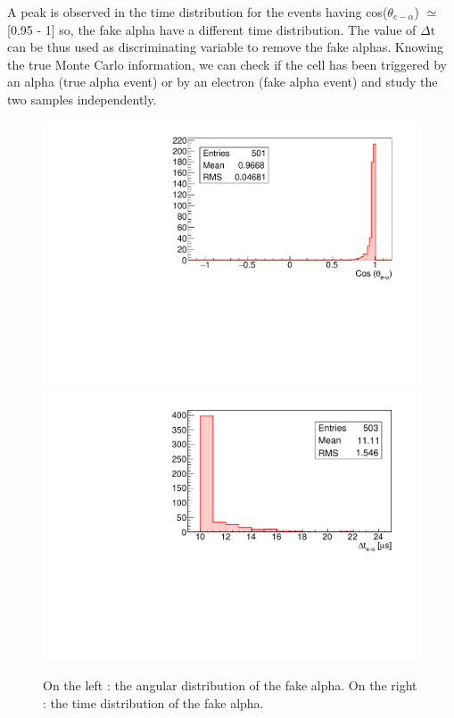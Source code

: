 \documentclass[main.tex]{subfiles}
\begin{document}
\bigskip

\noindent A peak is observed in the time distribution for the events having cos($\theta_{e-\alpha}$) $\simeq$ [0.95 - 1] so, the fake alpha have a different time distribution. The value of $\Delta \text{t}$ can be thus used as discriminating variable to remove the fake alphas. Knowing the true Monte Carlo information, we can check if the cell has been triggered by an alpha (true alpha event) or by an electron (fake alpha event) and study the two samples independently.


\begin{figure}[h!]
\begin{center}
\includegraphics[scale=0.34]{pictures/Chap5/fake_alpha_angle_distribution.pdf}
\includegraphics[scale=0.34]{pictures/Chap5/fake_alpha_time_distribution.pdf}
\caption{On the left : the angular distribution of the fake alpha. On the right : the time distribution of the fake alpha.}
\label{fakeAlphadistribution}
\end{center}
\end{figure}
\end{document}
